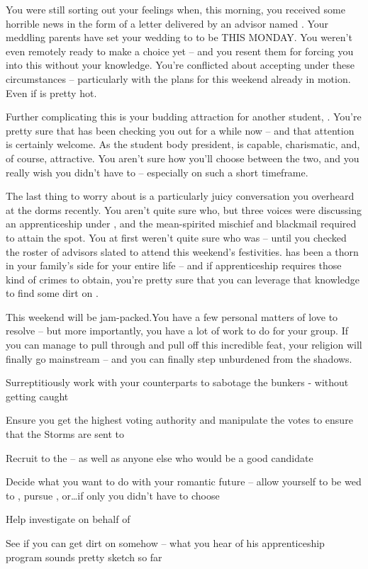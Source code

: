 \documentclass[char]{GL2020}
\begin{document}
You were still sorting out your feelings when, this morning, you received some horrible news in the form of a letter delivered by an advisor named \cDiplomat{}. Your meddling parents have set your wedding to \cHeir{} to be THIS MONDAY. You weren’t even remotely ready to make a choice yet -- and you resent them for forcing you into this without your knowledge. You’re conflicted about accepting under these circumstances -- particularly with the \pGoaties{} plans for this weekend already in motion. Even if \cHeir{} is pretty hot.
 
Further complicating this is your budding attraction for another student, \cPresident{}. You’re pretty sure that \cPresident{} has been checking you out for a while now -- and that attention is certainly welcome. As the student body president, \cPresident{} is capable, charismatic, and, of course, attractive. You aren’t sure how you’ll choose between the two, and you really wish you didn’t have to -- especially on such a short timeframe.
 
The last thing to worry about is a particularly juicy conversation you overheard at the dorms recently. You aren’t quite sure who, but three voices were discussing an apprenticeship under \cEvil{}, and the mean-spirited mischief and blackmail required to attain the spot. You at first weren’t quite sure who \cEvil{} was -- until you checked the roster of advisors slated to attend this weekend’s festivities. \cEvil{} has been a thorn in your family’s side for your entire life -- and if \cEvil{\their} apprenticeship requires those kind of crimes to obtain, you’re pretty sure that you can leverage that knowledge to find some dirt on \cEvil{\them}.
 
This weekend will be jam-packed.You have a few personal matters of love to resolve -- but more importantly, you have a lot of work to do for your group. If you can manage to pull through and pull off this incredible feat, your religion will finally go mainstream -- and you can finally step unburdened from the shadows.
 
\begin{itemz}[Goals]
	\item Surreptitiously work with your counterparts to sabotage the bunkers - without getting caught
	\item Ensure you get the highest voting authority and manipulate the votes to ensure that the Storms are sent to \pSc{}
	\item Recruit \cAmbition{} to the \pGoaties{} -- as well as anyone else who would be a good candidate
	\item Decide what you want to do with your romantic future -- allow yourself to be wed to \cHeir{}, pursue \cPresident{}, or\ldots if only you didn't have to choose
	\item Help investigate \cChupSecond{} on behalf of \cChupLeader{}
	\item See if you can get dirt on \cEvil{} somehow -- what you hear of his apprenticeship program sounds pretty sketch so far
\end{itemz}
 
\end{document}
